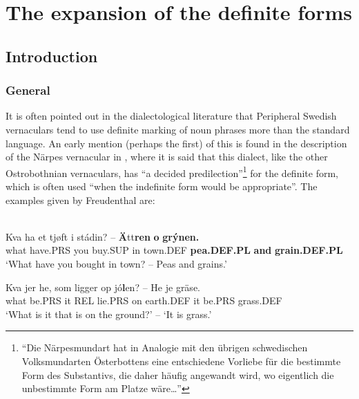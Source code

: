 \newcommand{\textstyleLinguisticExample}[1]{\emph{#1}}
\newcommand{\gl}{}
\newcommand{\textstyleBodyTextFirstChar}{}
\newcommand{\textstyleBodytextCChar}{}

\chapter{The expansion of the definite forms}
\label{bkm:Ref155077895}\label{bkm:Ref156803843}\label{bkm:Ref160007852}\section{ Introduction}
\subsection{ General}

It is often pointed out in the dialectological literature that Peripheral Swedish vernaculars tend to use definite marking of noun phrases more than the standard language. An early mention (perhaps the first) of this is found in the description of the Närpes vernacular in \citet[137]{Freudenthal1878}, where it is said that this dialect, like the other Ostrobothnian vernaculars, has “a decided predilection”\footnote{ “Die Närpesmundart hat in Analogie mit den übrigen schwedischen Volksmundarten Österbottens eine entschiedene Vorliebe für die bestimmte Form des Substantivs, die daher häufig angewandt wird, wo eigentlich die unbestimmte Form am Platze wäre…”} for the definite form, which is often used “when the indefinite form would be appropriate”. The examples given by Freudenthal are:


\ea\label{}
\\
	\ea
		\gll	Kva ha et  tjøft  i  stádin?  --  \textbf{Ä}tt\textbf{ren} \textbf{o} \textbf{grýnen.}\\
				what have.PRS you  buy.SUP  in  town.DEF    \textbf{pea.DEF.PL} \textbf{and} \textbf{grain.DEF.PL}\\
		\glt 	‘What have you bought in town? – Peas and grains.’

	\ex
		\gll	Kva  jer  he,  som  ligger  op  jó\textbf{l}en?  --  He  je  gräse.\\
				what  be.PRS  it  REL  lie.PRS  on  earth.DEF    it  be.PRS  grass.DEF\\
		\glt 	‘What is it that is on the ground?’ – ‘It is grass.’

